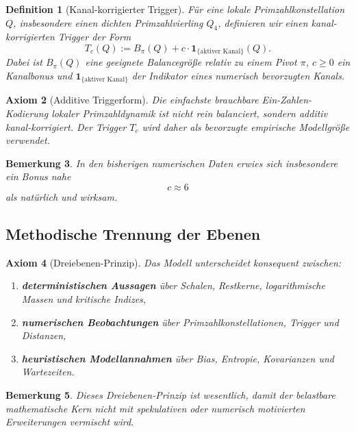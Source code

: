 \documentclass[11pt,a4paper]{article}
\newtheorem{definition}{Definition}[section]
\newtheorem{axiom}[definition]{Axiom}
\newtheorem{bemerkung}[definition]{Bemerkung}
\begin{document}
	\begin{definition}[Kanal-korrigierter Trigger]
		\label{def:modell_trigger}
		Für eine lokale Primzahlkonstellation \(Q\), insbesondere einen dichten Primzahlvierling \(Q_4\), definieren wir einen kanal-korrigierten Trigger der Form
		\[
		T_c(Q):=B_\pi(Q)+c\cdot \mathbf{1}_{\{\text{aktiver Kanal}\}}(Q).
		\]
		Dabei ist \(B_\pi(Q)\) eine geeignete Balancegröße relativ zu einem Pivot \(\pi\), \(c\ge 0\) ein Kanalbonus und \(\mathbf{1}_{\{\text{aktiver Kanal}\}}\) der Indikator eines numerisch bevorzugten Kanals.
	\end{definition}
	
	\begin{axiom}[Additive Triggerform]
		\label{ax:triggerform}
		Die einfachste brauchbare Ein-Zahlen-Kodierung lokaler Primzahldynamik ist nicht rein balanciert, sondern additiv kanal-korrigiert. Der Trigger \(T_c\) wird daher als bevorzugte empirische Modellgröße verwendet.
	\end{axiom}
	
	\begin{bemerkung}
		In den bisherigen numerischen Daten erwies sich insbesondere ein Bonus nahe
		\[
		c\approx 6
		\]
		als natürlich und wirksam.
	\end{bemerkung}
	
	\subsection{Methodische Trennung der Ebenen}
	
	\begin{axiom}[Dreiebenen-Prinzip]
		\label{ax:drei_ebenen}
		Das Modell unterscheidet konsequent zwischen:
		\begin{enumerate}
			\item \textbf{deterministischen Aussagen} über Schalen, Restkerne, logarithmische Massen und kritische Indizes,
			\item \textbf{numerischen Beobachtungen} über Primzahlkonstellationen, Trigger und Distanzen,
			\item \textbf{heuristischen Modellannahmen} über Bias, Entropie, Kovarianzen und Wartezeiten.
		\end{enumerate}
	\end{axiom}
	
	\begin{bemerkung}
		Dieses Dreiebenen-Prinzip ist wesentlich, damit der belastbare mathematische Kern nicht mit spekulativen oder numerisch motivierten Erweiterungen vermischt wird.
	\end{bemerkung}
	
\end{document}
